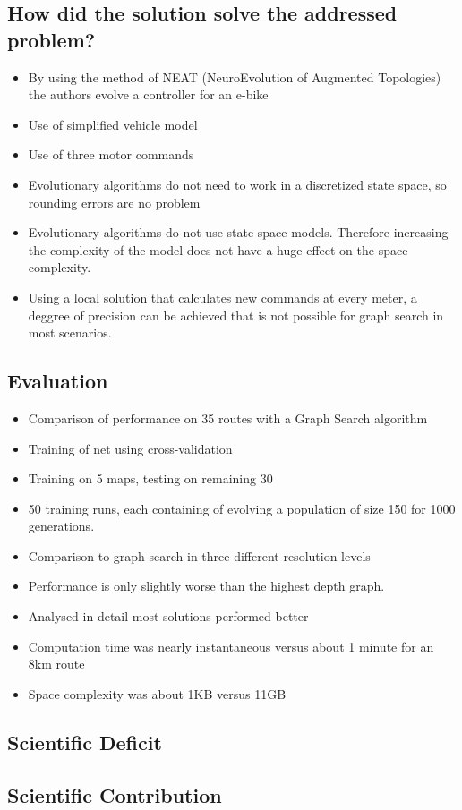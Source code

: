 \documentclass[paper=a4, fontsize=11pt]{scrartcl} %
\numberwithin{equation}{section} %
\numberwithin{figure}{section} %
\numberwithin{table}{section} %
\begin{document}
\subsection{How did the solution solve the addressed problem?}
\begin{itemize}
	\item By using the method of NEAT (NeuroEvolution of Augmented Topologies) the authors evolve a controller for an e-bike 
	\item Use of simplified vehicle model 
	\item Use of three motor commands
	\item Evolutionary algorithms do not need to work in a discretized state space, so rounding errors are no problem
	\item Evolutionary algorithms do not use state space models. Therefore increasing the complexity of the model does not have a huge effect on the space complexity.
	\item Using a local solution that calculates new commands at every meter, a deggree of precision can be achieved that is not possible for graph search in most scenarios.
\end{itemize}


\subsection{Evaluation}
\begin{itemize}
	\item Comparison of performance on 35 routes with a Graph Search algorithm
	\item Training of net using cross-validation
	\item Training on 5 maps, testing on remaining 30
	\item 50 training runs, each containing of evolving a population of size 150 for 1000 generations.
	\item Comparison to graph search in three different resolution levels
	\item Performance is only slightly worse than the highest depth graph.
	\item Analysed in detail most solutions performed better
	\item Computation time was nearly instantaneous versus about 1 minute for an 8km route
	\item Space complexity was about 1KB versus 11GB
\end{itemize}

\subsection{Scientific Deficit}

\subsection{Scientific Contribution}
\end{document}
